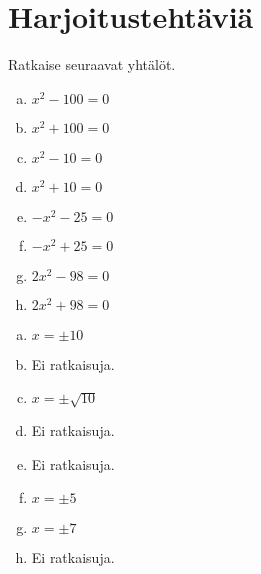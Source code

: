 \section{Harjoitustehtäviä}

\begin{tehtava}
    Ratkaise seuraavat yhtälöt.
    \begin{enumerate}[a)]
        \item $x^2 - 100 = 0$
        \item $x^2 + 100 = 0$
        \item $x^2 - 10 = 0$
        \item $x^2 + 10 = 0$
        \item $-x^2 - 25 = 0$
        \item $-x^2 + 25 = 0$
        \item $2x^2 - 98 = 0$
        \item $2x^2 + 98 = 0$
    \end{enumerate}
    \begin{vastaus}
        \begin{enumerate}[a)]
            \item $x=\pm10$
            \item Ei ratkaisuja.
            \item $x=\pm\sqrt{10}$
            \item Ei ratkaisuja.
            \item Ei ratkaisuja.
            \item $x=\pm5$
            \item $x=\pm7$
            \item Ei ratkaisuja.
        \end{enumerate}
    \end{vastaus}
\end{tehtava}

